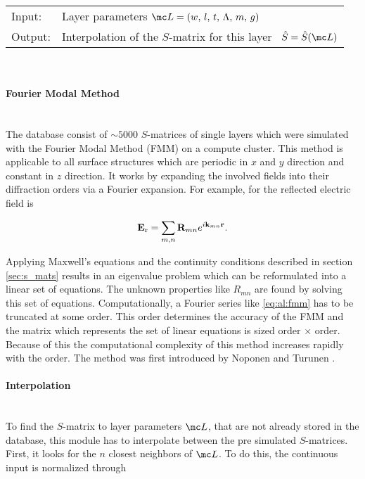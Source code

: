 \begin{tabular}{ll}
    \toprule
    Input: & Layer parameters 
    $\mc L = (w, \, l, \, t, \, \Lambda, \, m, \, g)$\\
    Output: & Interpolation of the $S$-matrix for this layer \
    $\hat{S} = \hat{S}(\mc L)$\\
    \bottomrule
\end{tabular}
\\

\paragraph{Fourier Modal Method} ~\\
\label{sec:FMM}The database consist of $\sim 5000$ $S$-matrices of single layers which were simulated with the Fourier Modal Method (FMM) on a compute cluster. This method is applicable to all surface structures which are periodic in $x$ and $y$ direction and constant in $z$ direction. It works by expanding the involved fields into their diffraction orders via a Fourier expansion. For example, for the reflected electric field is

\begin{equation} \label{eq:al:fmm}
    \vb E_{\mathrm{r}} = \sum_{m,n} \vb R_{mn} e^{i \vb k_{mn} \vb r}.
\end{equation}

Applying Maxwell's equations and the continuity conditions described in section \ref{sec:s_mats} results in an eigenvalue problem which can be reformulated into a linear set of equations. The unknown properties like $R_{mn}$ are found by solving this set of equations. Computationally, a Fourier series like \eqref{eq:al:fmm} has to be truncated at some order. This order determines the accuracy of the FMM and the matrix which represents the set of linear equations is sized order $\times$ order. Because of this the computational complexity of this method increases rapidly with the order. The method was first introduced by Noponen and Turunen \cite{Noponen1994}.

\paragraph{Interpolation} ~\\
To find the $S$-matrix to layer parameters $\mc L$, that are not already stored in the database, this module has to interpolate between the pre simulated $S$-matrices. First, it looks for the $n$ closest neighbors of $\mc L$. To do this, the continuous input is normalized through

